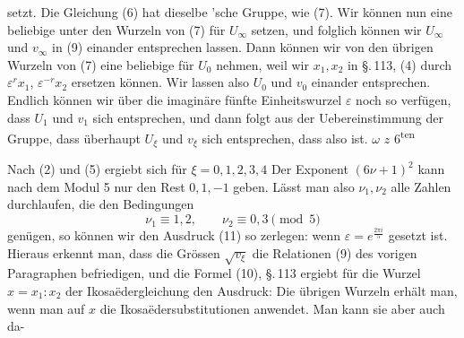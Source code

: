 setzt. Die Gleichung (6) hat dieselbe 'sche Gruppe, wie (7). Wir können nun eine beliebige unter den Wurzeln von (7) für $U_\infty$ setzen, und folglich können wir $U_\infty$ und $v_\infty$ in (9) einander entsprechen lassen. Dann können wir von den übrigen Wurzeln von (7) eine beliebige für $U_0$ nehmen, weil wir $x_1, x_2$ in \S.\,113, (4) durch $\varepsilon^r x_1$, $\varepsilon^{-r} x_2$ ersetzen können. Wir lassen also $U_0$ und $v_0$ einander entsprechen. Endlich können wir über die imaginäre fünfte Einheitswurzel $\varepsilon$ noch so verfügen, dass $U_1$ und $v_1$ sich entsprechen, und dann folgt aus der Uebereinstimmung der Gruppe, dass überhaupt $U_\xi$ und $v_\xi$ sich entsprechen, dass also
ist.  $\omega$  $z$  6\textsuperscript{ten} 

Nach (2) und (5) ergiebt sich für $\xi = 0, 1, 2, 3, 4$
Der Exponent $(6\nu+1)^2$ kann nach dem Modul 5 nur den Rest $0, 1, -1$ geben. Lässt man also $\nu_1, \nu_2$ alle Zahlen durchlaufen, die den Bedingungen
\[
\nu_1 \equiv 1, 2, \qquad \nu_2 \equiv 0, 3 \pmod{5}
\]
genügen, so können wir den Ausdruck (11) so zerlegen:
wenn $\varepsilon = e^{\frac{2\pi i}{5}}$ gesetzt ist. Hieraus erkennt man, dass die Grössen $\sqrt{v_\xi}$ die Relationen (9) des vorigen Paragraphen befriedigen, und die Formel (10), \S.\,113 ergiebt für die Wurzel $x = x_1 : x_2$ der Ikosaëdergleichung den Ausdruck:
Die übrigen Wurzeln erhält man, wenn man auf $x$ die Ikosaëdersubstitutionen anwendet. Man kann sie aber auch da-
